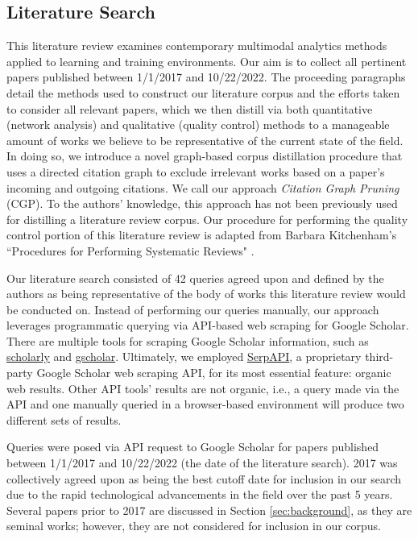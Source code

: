 \documentclass[manuscript,screen,review]{acmart}
\begin{document}
\subsection{Literature Search} \label{subsec:literature_search}

This literature review examines contemporary multimodal analytics methods applied to learning and training environments. Our aim is to collect all pertinent papers published between 1/1/2017 and 10/22/2022. The proceeding paragraphs detail the methods used to construct our literature corpus and the efforts taken to consider all relevant papers, which we then distill via both quantitative (network analysis) and qualitative (quality control) methods to a manageable amount of works we believe to be representative of the current state of the field. In doing so, we introduce a novel graph-based corpus distillation procedure that uses a directed citation graph to exclude irrelevant works based on a paper's incoming and outgoing citations. We call our approach \textit{Citation Graph Pruning} (CGP). To the authors' knowledge, this approach has not been previously used for distilling a literature review corpus. Our procedure for performing the quality control portion of this literature review is adapted from Barbara Kitchenham's ``Procedures for Performing Systematic Reviews" \cite{kitchenham2004procedures}.

Our literature search consisted of 42 queries agreed upon and defined by the authors as being representative of the body of works this literature review would be conducted on. Instead of performing our queries manually, our approach leverages programmatic querying via API-based web scraping for Google Scholar. There are multiple tools for scraping Google Scholar information, such as \href{https://pypi.org/project/scholarly/}{scholarly} and \href{https://github.com/venthur/gscholar}{gscholar}. Ultimately, we employed \href{https://serpapi.com/google-scholar-api}{SerpAPI}, a proprietary third-party Google Scholar web scraping API, for its most essential feature: organic web results. Other API tools' results are not organic, i.e., a query made via the API and one manually queried in a browser-based environment will produce two different sets of results.

Queries were posed via API request to Google Scholar for papers published between 1/1/2017 and 10/22/2022 (the date of the literature search). 2017 was collectively agreed upon as being the best cutoff date for inclusion in our search due to the rapid technological advancements in the field over the past 5 years. Several papers prior to 2017 are discussed in Section \ref{sec:background}, as they are seminal works; however, they are not considered for inclusion in our corpus. 
\end{document}
